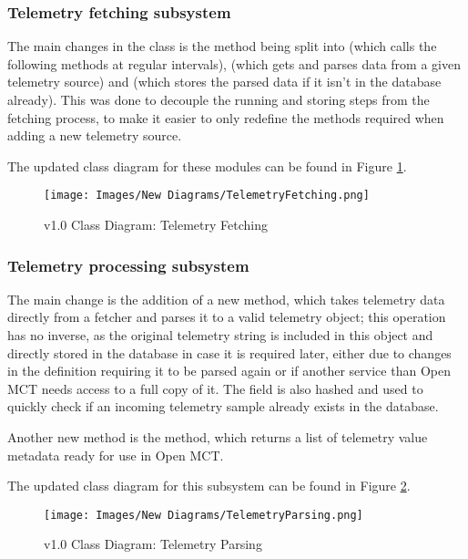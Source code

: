 \subsubsection{Telemetry fetching subsystem}
The main changes in the  class is the  method being split into  (which calls the following methods at regular intervals),  (which gets and parses data from a given telemetry source) and  (which stores the parsed data if it isn't in the database already). This was done to decouple the running and storing steps from the fetching process, to make it easier to only redefine the methods required when adding a new telemetry source.

The updated class diagram for these modules can be found in Figure \ref{fig:new_cdfetching}.

\begin{figure}[H]
  \centering
  \texttt{[image: Images/New Diagrams/TelemetryFetching.png]}
  \caption{v1.0 Class Diagram: Telemetry Fetching}
  \label{fig:new_cdfetching}
\end{figure}

\subsubsection{Telemetry processing subsystem}
The main change is the addition of a new  method, which takes telemetry data directly from a fetcher and parses it to a valid telemetry object; this operation has no inverse, as the original telemetry string is included in this object and directly stored in the database in case it is required later, either due to changes in the definition requiring it to be parsed again or if another service than Open MCT needs access to a full copy of it. The field is also hashed and used to quickly check if an incoming telemetry sample already exists in the database.

Another new method is the  method, which returns a list of telemetry value \gls{metadata} ready for use in Open MCT.

The updated class diagram for this subsystem can be found in Figure \ref{fig:new_cdparsing}.

\begin{figure}[H]
  \centering
  \texttt{[image: Images/New Diagrams/TelemetryParsing.png]}
  \caption{v1.0 Class Diagram: Telemetry Parsing}
  \label{fig:new_cdparsing}
\end{figure}

